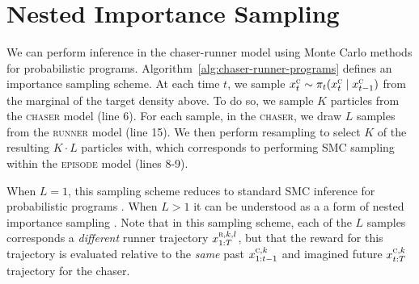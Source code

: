 \documentclass{article}
\begin{document}
\vspace{-0.25em}
\section{Nested Importance Sampling}
\vspace{-0.25em}

We can perform inference in the chaser-runner model using Monte Carlo methods for probabilistic programs. Algorithm~\ref{alg:chaser-runner-programs} defines an importance sampling scheme. At each time $t$, we sample $x^\textsc{c}_t \sim \pi_t(x^\textsc{c}_t \mid x^\textsc{c}_{t-1})$ from the marginal of the target density above. To do so, we sample $K$ particles from the \textsc{chaser} model (line 6). For each sample, in the \textsc{chaser}, we draw $L$ samples from the \textsc{runner} model (line 15). We then perform resampling to select $K$ of the resulting $K \cdot L$ particles with, which corresponds to performing SMC sampling within the \textsc{episode} model (lines 8-9). 




When $L=1$, this sampling scheme reduces to standard SMC inference for probabilistic programs \cite{wood-aistats-2014}. When $L>1$ it can be understood as a a form of nested importance sampling \cite{naesseth2015nested}. Note that in this sampling scheme, each of the $L$ samples corresponds a \emph{different} runner trajectory $x^{\textsc{r},k,l}_{1:T}$, but that the reward for this trajectory is evaluated relative to the \emph{same} past $x^{\textsc{c},k}_{1:t-1}$ and imagined future $x^{\textsc{c},k}_{t:T}$ trajectory for the chaser. 
\end{document}

